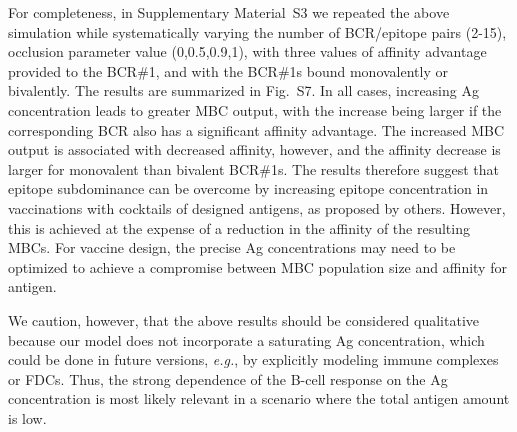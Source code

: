 \documentclass[utf8]{frontiersHLTH}%
\newcommand{\cred}[1]{#1} %
\newcommand{\vo}[1]{#1} %
\def\eg {{\it e.g.}}
\newcommand{\SI}{Supplementary Material}
\begin{document}
For completeness, in \SI~S3 we repeated the above simulation while systematically varying the
number of BCR/epitope pairs \vo{(2-15)}, occlusion parameter value \vo{(0,0.5,0.9,1)}, with
three values of affinity advantage provided to the
BCR\#1, and with the BCR\#1s bound monovalently or bivalently. The results are summarized in Fig.~S7.
In all cases, increasing Ag concentration leads to
greater MBC output, with the increase being larger if the
corresponding BCR also has a significant affinity advantage.
The increased MBC output is associated with decreased affinity, however, and the affinity decrease
is larger for monovalent than bivalent
BCR\#1s. The results therefore suggest that
epitope subdominance can be overcome by increasing epitope concentration
in vaccinations with cocktails of designed antigens, as proposed by
others.\cite{kanekiyo19,cohen21,glanville20}  However, this is \vo{achieved} at the expense of a
reduction in the affinity of the resulting MBCs.
For vaccine design, the precise Ag concentrations may need to be 
optimized to achieve a compromise between MBC population
size and affinity for antigen.
%
\cred{
We caution, however, that the above results should be considered qualitative
because our model does not incorporate a saturating Ag concentration, which could be done 
in future versions, \eg, by explicitly modeling immune complexes or FDCs.
Thus, the strong dependence of the B-cell response on the Ag concentration
is most likely relevant in a scenario where the total antigen amount is low.
}
\end{document}
